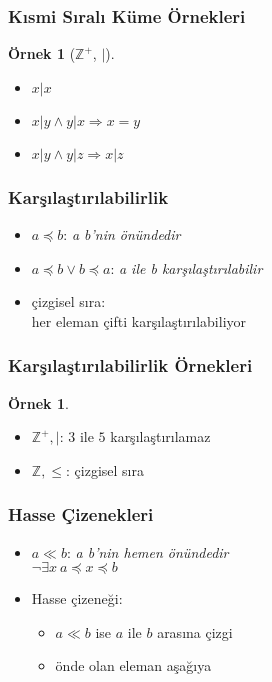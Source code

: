 \documentclass[dvipsnames]{beamer}
\theoremstyle{definition}
\theoremstyle{example}
\newtheorem{ornek}[theorem]{Örnek}
\theoremstyle{plain}
\begin{document}
\begin{frame}
  \frametitle{Kısmi Sıralı Küme Örnekleri}

  \begin{ornek}[$\mathbb{Z}^+$, $|$]
    \begin{itemize}
      \item $x | x$
      \item $x | y \wedge y | x \Rightarrow x = y$
      \item $x | y \wedge y | z \Rightarrow x | z$
    \end{itemize}
  \end{ornek}
\end{frame}

\begin{frame}
  \frametitle{Karşılaştırılabilirlik}

  \begin{itemize}
    \item $a \preceq b$: \emph{a b'nin önündedir}

    \medskip
    \item $a \preceq b \vee b \preceq a$: \emph{a ile b karşılaştırılabilir}

    \pause
    \bigskip
    \item \alert{çizgisel sıra}:\\
      her eleman çifti karşılaştırılabiliyor
  \end{itemize}
\end{frame}

\begin{frame}
  \frametitle{Karşılaştırılabilirlik Örnekleri}

  \begin{ornek}
    \begin{itemize}
      \item $\mathbb{Z}^+,|$: $3$ ile $5$ karşılaştırılamaz

      \pause
      \medskip
      \item $\mathbb{Z},\leq$: çizgisel sıra
    \end{itemize}
  \end{ornek}
\end{frame}

\begin{frame}
  \frametitle{Hasse Çizenekleri}

  \begin{itemize}
    \item $a \ll b$: \emph{a b'nin hemen önündedir}\\
      $\neg \exists x~ a \preceq x \preceq b$

    \pause
    \medskip
    \item Hasse çizeneği:
    \begin{itemize}
      \item $a \ll b$ ise $a$ ile $b$ arasına çizgi
      \item önde olan eleman aşağıya
    \end{itemize}
  \end{itemize}
\end{frame}
\end{document}
